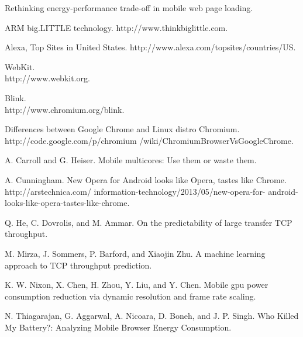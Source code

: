 \documentclass{sig-alternate-05-2015}
\begin{document}

\begin{thebibliography}{1}
	\newblock Rethinking energy-performance trade-off in mobile web page loading.
	\newblock {}
	
	\newblock ARM big.LITTLE technology.
	\newblock http://www.thinkbiglittle.com.
	
	\newblock Alexa, Top Sites in United States.
	\newblock http://www.alexa.com/topsites/countries/US.
	
	\newblock WebKit. \\
	\newblock http://www.webkit.org.
	
	\newblock Blink. \\
	\newblock http://www.chromium.org/blink.
	
	\newblock Differences between Google Chrome and Linux distro Chromium. \\
	\newblock http://code.google.com/p/chromium /wiki/ChromiumBrowserVsGoogleChrome.
	
	\newblock A. Carroll and G. Heiser. Mobile multicores: Use them or waste them.
	\newblock {}
	
	\newblock A. Cunningham. New Opera for Android looks like Opera, tastes like Chrome.
	\newblock http://arstechnica.com/ information-technology/2013/05/new-opera-for- android-looks-like-opera-tastes-like-chrome.
	
	\newblock Q. He, C. Dovrolis, and M. Ammar. On the predictability of large transfer TCP throughput.
	\newblock {}
	
	\newblock M. Mirza, J. Sommers, P. Barford, and Xiaojin Zhu. A machine learning approach to TCP throughput prediction.
	\newblock {}
	
	\newblock K. W. Nixon, X. Chen, H. Zhou, Y. Liu, and Y. Chen. Mobile gpu power consumption reduction via dynamic resolution and frame rate scaling.
	\newblock {}
	
	\newblock N. Thiagarajan, G. Aggarwal, A. Nicoara, D. Boneh, and J. P. Singh. Who Killed My Battery?: Analyzing Mobile Browser Energy Consumption.
	\newblock {}
	

\end{thebibliography}
\end{document}

